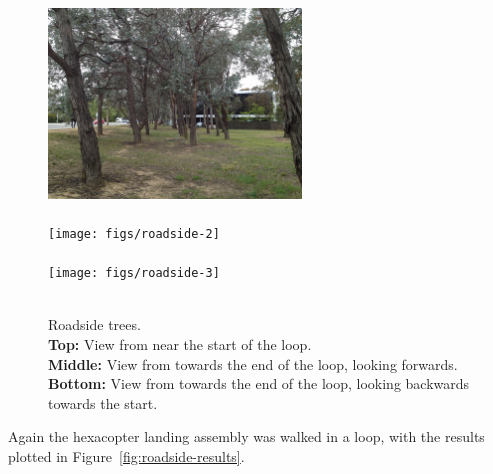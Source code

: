 \documentclass[12pt,oneside,a4paper]{book}
\begin{document}
\begin{figure}
  \centering
  \includegraphics[width=0.6\textwidth]{figs/roadside-1}\\
  ~\\
  \texttt{[image: figs/roadside-2]}\\
  ~\\
  \texttt{[image: figs/roadside-3]}\\
  ~\\
  \caption{Roadside trees.\\\textbf{Top:} View from near the start of
    the loop.\\\textbf{Middle:} View from towards the end of the loop,
  looking forwards.\\\textbf{Bottom:} View from towards the end of the
  loop, looking backwards towards the start.}
  \label{fig:roadside-trees}
\end{figure}

Again the hexacopter landing assembly was walked in a loop, with the
results plotted in Figure~\ref{fig:roadside-results}.
\end{document}
